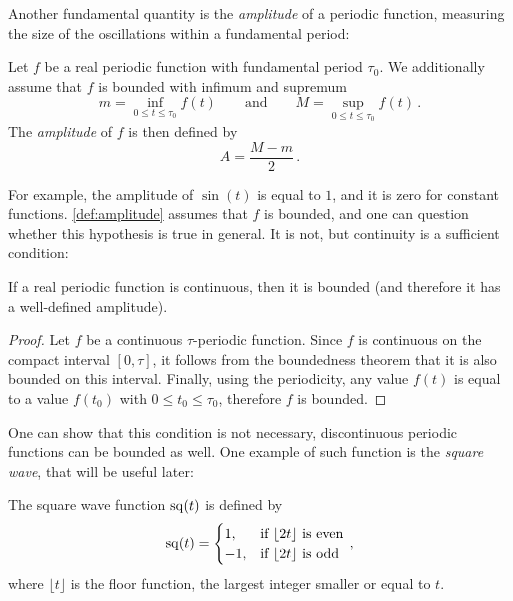 Another fundamental quantity is the \emph{amplitude} of a
periodic function, measuring the size of the oscillations within a fundamental period:
\begin{definition}
  \label{def:amplitude}
  Let $f$ be a real periodic function with fundamental period $\tau_0$. We additionally
  assume that $f$ is bounded with infimum and supremum
  \begin{equation}
    m=\inf_{0\leq t\leq \tau_0}f(t)\qquad\text{and}\qquad M=\sup_{0\leq t\leq \tau_0}f(t)\,.
  \end{equation}
  The \emph{amplitude} of $f$ is then defined by
  \begin{equation}
    A=\frac{M-m}{2}\,.
  \end{equation}
\end{definition}
For example, the amplitude of $\sin(t)$ is equal to $1$, and it is zero for
constant functions. \cref{def:amplitude} assumes that $f$ is bounded, and one can question
whether this hypothesis is true in general. It is not, but continuity is a sufficient
condition:
\begin{proposition}
  If a real periodic function is continuous, then it is bounded (and therefore it has a
  well-defined amplitude).
\end{proposition}
\begin{proof}
  Let $f$ be a continuous $\tau$-periodic function. Since $f$ is continuous on the compact
  interval $[0,\tau]$, it follows from the boundedness theorem that it is also bounded on
  this interval. Finally, using the periodicity, any value $f(t)$ is equal to a value
  $f(t_0)$ with $0\leq t_0\leq \tau_0$, therefore $f$ is bounded.
\end{proof}
One can show that this condition is not necessary, \ie discontinuous periodic
functions can be bounded as well. One example of such function is the \emph{square wave},
that will be useful later:
\begin{definition}
  \label{def:sq-wave}
  The square wave function $\operatorname{sq}(t)$ is defined by
  \begin{equation}
    \operatorname{sq}(t)=
    \begin{cases}
      1, &\text{if~}\lfloor 2t\rfloor~\text{is even}\\
      -1, &\text{if~}\lfloor 2t\rfloor~\text{is odd}\\
    \end{cases}\,,
    \label{eq:wave-square}
  \end{equation}
  where $\lfloor t\rfloor$ is the floor function, \ie the largest integer smaller or equal
  to $t$.
\end{definition}
